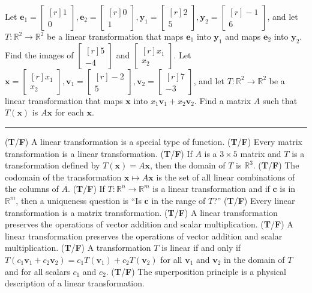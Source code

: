 \documentclass[11pt,answers]{exam} %
\renewcommand{\vec}[1]{\mathbf{#1}}
\newcommand{\mat}[1]{\begin{bmatrix*}[r] #1 \end{bmatrix*}}
\begin{document}
\begin{questions}
    \question Let $\vec{e}_1 = \mat{1\\0}, \vec{e}_2 = \mat{0\\1}, \vec{y}_1=\mat{2\\5}, \vec{y}_2=\mat{-1\\6}$, and let $T:\mathbb{R}^2\rightarrow\mathbb{R}^2$ be a linear transformation that maps $\vec{e}_1$ into $\vec{y}_1$ and maps $\vec{e}_2$ into $\vec{y}_2$. Find the images of $\mat{5\\-4}$ and $\mat{x_1 \\ x_2}$.
    \question Let $\vec{x} = \mat{x_1 \\ x_2}, \vec{v}_1 = \mat{-2 \\ 5}, \vec{v}_2 = \mat{7\\-3}$, and let $T:\mathbb{R}^2\rightarrow \mathbb{R}^2$ be a linear transformation that maps $\vec{x}$ into $x_1\vec{v}_1+x_2\vec{v}_2$. Find a matrix $A$ such that $T(\vec{x})$ is $A\vec{x}$ for each $\vec{x}$.
    \begin{center}\rule{4in}{0.1mm}\end{center}
    \question (\textbf{T}/\textbf{F}) A linear transformation is a special type of function.
    \question (\textbf{T}/\textbf{F}) Every matrix transformation is a linear transformation.
    \question (\textbf{T}/\textbf{F}) If $A$ is a $3 \times 5$ matrix and $T$ is a transformation defined by $T(\vec{x}) = A\vec{x}$, then the domain of $T$ is $\mathbb{R}^3$.
    \question (\textbf{T}/\textbf{F}) The codomain of the transformation $\vec{x} \mapsto A\vec{x}$ is the set of all linear combinations of the columns of $A$.
    \question (\textbf{T}/\textbf{F}) If $T : \mathbb{R}^n \rightarrow \mathbb{R}^m$ is a linear transformation and if $\vec{c}$ is in $\mathbb{R}^m$, then a uniqueness question is ``Is $\vec{c}$ in the range of $T$?''
    \question (\textbf{T}/\textbf{F}) Every linear transformation is a matrix transformation.
    \question (\textbf{T}/\textbf{F}) A linear transformation preserves the operations of vector addition and scalar multiplication.
    \question (\textbf{T}/\textbf{F}) A linear transformation preserves the operations of vector addition and scalar multiplication.
    \question (\textbf{T}/\textbf{F}) A transformation $T$ is linear if and only if $T\left(c_1\vec{v}_1 + c_2\vec{v}_2\right) = c_1 T(\vec{v}_1) + c_2 T(\vec{v}_2)$ for all $\vec{v}_1$ and $\vec{v}_2$ in the domain of $T$ and for all scalars $c_1$ and $c_2$.
    \question (\textbf{T}/\textbf{F}) The superposition principle is a physical description of a linear transformation.

\end{questions}
\end{document}
